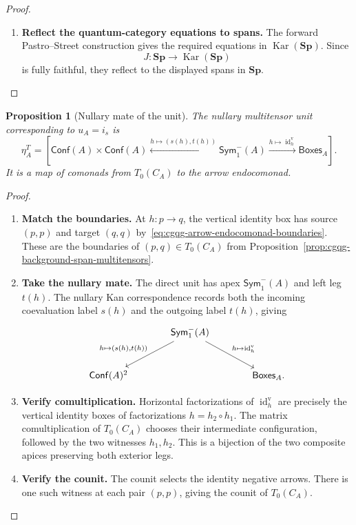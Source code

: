 \documentclass[oneside]{article}
\newcommand{\Boxes}{\mathsf{Boxes}}
\newcommand{\Conf}{\mathsf{Conf}}
\newcommand{\Sym}{\mathsf{Sym}}
\newcommand{\Sp}{\mathbf{Sp}}
\newcommand{\Kar}{\operatorname{Kar}}
\newcommand{\id}{\operatorname{id}}
\theoremstyle{plain}
\newtheorem{proposition}[theorem]{Proposition}
\theoremstyle{definition}
\theoremstyle{remark}
\begin{document}
\begin{proof}
\begin{enumerate}[beginpenalty=10000]
        \item \textbf{Reflect the quantum-category equations to spans.} The forward Pastro--Street construction gives the required equations in \(\Kar(\Sp)\). Since
        \[
            J:\Sp\longrightarrow\Kar(\Sp)
        \]
        is fully faithful, they reflect to the displayed spans in \(\Sp\). \qedhere
    \end{enumerate}
\end{proof}

\begin{proposition}[Nullary mate of the unit]
\label{prop:cgqg-explicit-nullary-unit-mate}
The nullary multitensor unit corresponding to \(u_A=i_s\) is
\begin{equation}
 \eta_A^T=
 \left[
 \Conf(A)\times\Conf(A)
 \xleftarrow{h\mapsto(s(h),t(h))}\Sym^-_1(A)
 \xrightarrow{h\mapsto\id_h^{\mathrm v}}\Boxes_A
 \right].
 \label{eq:cgqg-explicit-nullary-unit-span}
\end{equation}
It is a map of comonads from \(T_0(C_A)\) to the arrow endocomonad.
\end{proposition}
\begin{proof}
    \leavevmode
    \begin{enumerate}[beginpenalty=10000]
        \item \textbf{Match the boundaries.} At \(h:p\to q\), the vertical identity box has source \((p,p)\) and target \((q,q)\) by~\eqref{eq:cgqg-arrow-endocomonad-boundaries}. These are the boundaries of \((p,q)\in T_0(C_A)\) from Proposition~\ref{prop:cgqg-background-span-multitensors}.

        \item \textbf{Take the nullary mate.} The direct unit has apex \(\Sym^-_1(A)\) and left leg \(t(h)\). The nullary Kan correspondence records both the incoming coevaluation label \(s(h)\) and the outgoing label \(t(h)\), giving
        \[
        \begin{tikzcd}[column sep=large,row sep=large]
        &\Sym^-_1(A)\arrow[dl,"{h\mapsto(s(h),t(h))}"']
          \arrow[dr,"{h\mapsto\id_h^{\mathrm v}}"]&\\
        \Conf(A)^2&&\Boxes_A.
        \end{tikzcd}
        \]

        \item \textbf{Verify comultiplication.} Horizontal factorizations of \(\id_h^{\mathrm v}\) are precisely the vertical identity boxes of factorizations \(h=h_2\circ h_1\). The matrix comultiplication of \(T_0(C_A)\) chooses their intermediate configuration, followed by the two witnesses \(h_1,h_2\). This is a bijection of the two composite apices preserving both exterior legs.

        \item \textbf{Verify the counit.} The counit selects the identity negative arrows. There is one such witness at each pair \((p,p)\), giving the counit of \(T_0(C_A)\). \qedhere
    \end{enumerate}
\end{proof}
\end{document}
